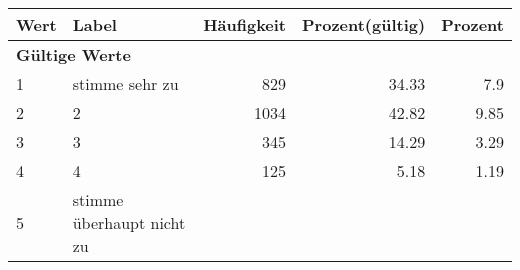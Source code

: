      \begin{longtable}{lXrrr}
     \toprule
     \textbf{Wert} & \textbf{Label} & \textbf{Häufigkeit} & \textbf{Prozent(gültig)} & \textbf{Prozent} \\
     \endhead
     \midrule
     \multicolumn{5}{l}{\textbf{Gültige Werte}}\\

     1 &
     \multicolumn{1}{X}{ stimme sehr zu   } &


       \num{829} &
       \num[round-mode=places,round-precision=2]{34,33} &
         \num[round-mode=places,round-precision=2]{7,9} \\

     2 &
     \multicolumn{1}{X}{ 2   } &


       \num{1034} &
       \num[round-mode=places,round-precision=2]{42,82} &
         \num[round-mode=places,round-precision=2]{9,85} \\

     3 &
     \multicolumn{1}{X}{ 3   } &


       \num{345} &
       \num[round-mode=places,round-precision=2]{14,29} &
         \num[round-mode=places,round-precision=2]{3,29} \\

     4 &
     \multicolumn{1}{X}{ 4   } &


       \num{125} &
       \num[round-mode=places,round-precision=2]{5,18} &
         \num[round-mode=places,round-precision=2]{1,19} \\

     5 &
     \multicolumn{1}{X}{ stimme überhaupt nicht zu   } &



\end{longtable}
